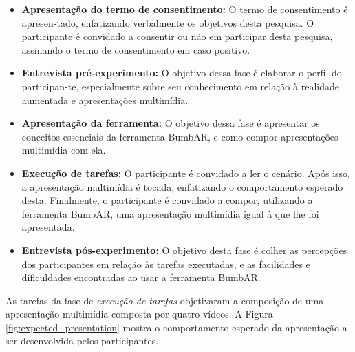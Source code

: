 \documentclass[../main.tex]{subfiles}
\begin{document}
\begin{itemize}
    \item \textbf{Apresentação do termo de consentimento:} O termo de consentimento é apresen-tado, enfatizando verbalmente os objetivos desta pesquisa. O participante é convidado a consentir ou não em participar desta pesquisa, assinando o termo de consentimento em caso positivo.
    \item \textbf{Entrevista pré-experimento:} O objetivo dessa fase é elaborar o perfil do participan-te, especialmente sobre seu conhecimento em relação à realidade aumentada e apresentações multimídia.
    \item \textbf{Apresentação da ferramenta:} O objetivo dessa fase é apresentar os conceitos essenciais da ferramenta BumbAR, e como compor apresentações multimídia com ela.
    \item \textbf{Execução de tarefas:} O participante é convidado a ler o cenário. Após isso, a apresentação multimídia é tocada, enfatizando o comportamento esperado desta. Finalmente, o participante é convidado a compor, utilizando a ferramenta BumbAR, uma apresentação multimídia igual à que lhe foi apresentada.
    \item \textbf{Entrevista pós-experimento:} O objetivo desta fase é colher as percepções dos participantes em relação às tarefas executadas, e as facilidades e dificuldades encontradas ao usar a ferramenta BumbAR.
\end{itemize}

As tarefas da fase de \emph{execução de tarefas} objetivaram a composição de uma apresentação multimídia composta por quatro vídeos. A Figura \ref{fig:expected_presentation} mostra o comportamento esperado da apresentação a ser desenvolvida pelos participantes.
\end{document}
